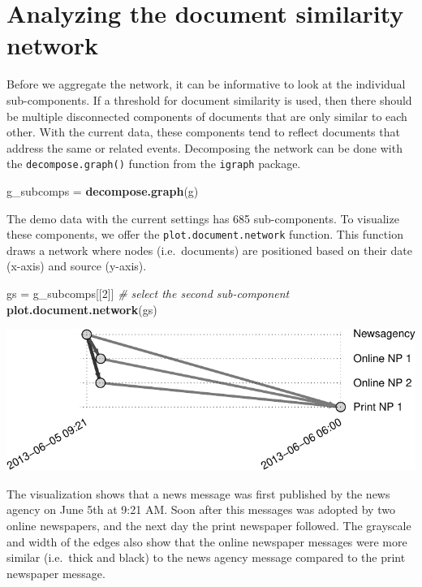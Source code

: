 \documentclass[]{article}
\newenvironment{Shaded}{\begin{snugshade}}{\end{snugshade}}
\newcommand{\KeywordTok}[1]{\textcolor[rgb]{0.13,0.29,0.53}{\textbf{{#1}}}}
\newcommand{\DecValTok}[1]{\textcolor[rgb]{0.00,0.00,0.81}{{#1}}}
\newcommand{\StringTok}[1]{\textcolor[rgb]{0.31,0.60,0.02}{{#1}}}
\newcommand{\CommentTok}[1]{\textcolor[rgb]{0.56,0.35,0.01}{\textit{{#1}}}}
\newcommand{\NormalTok}[1]{{#1}}
\begin{document}
\section{Analyzing the document similarity
network}\label{analyzing-the-document-similarity-network}

Before we aggregate the network, it can be informative to look at the
individual sub-components. If a threshold for document similarity is
used, then there should be multiple disconnected components of documents
that are only similar to each other. With the current data, these
components tend to reflect documents that address the same or related
events. Decomposing the network can be done with the
\texttt{decompose.graph()} function from the \texttt{igraph} package.

\begin{Shaded}
\begin{Highlighting}[]
\NormalTok{g_subcomps =}\StringTok{ }\KeywordTok{decompose.graph}\NormalTok{(g)}
\end{Highlighting}
\end{Shaded}

The demo data with the current settings has 685 sub-components. To
visualize these components, we offer the \texttt{plot.document.network}
function. This function draws a network where nodes (i.e.~documents) are
positioned based on their date (x-axis) and source (y-axis).

\begin{Shaded}
\begin{Highlighting}[]
\NormalTok{gs =}\StringTok{ }\NormalTok{g_subcomps[[}\DecValTok{2}\NormalTok{]] }\CommentTok{# select the second sub-component}
\KeywordTok{plot.document.network}\NormalTok{(gs)}
\end{Highlighting}
\end{Shaded}

\includegraphics{vignette_files/figure-latex/unnamed-chunk-15-1.pdf}

The visualization shows that a news message was first published by the
news agency on June 5th at 9:21 AM. Soon after this messages was adopted
by two online newspapers, and the next day the print newspaper followed.
The grayscale and width of the edges also show that the online newspaper
messages were more similar (i.e.~thick and black) to the news agency
message compared to the print newspaper message.
\end{document}
